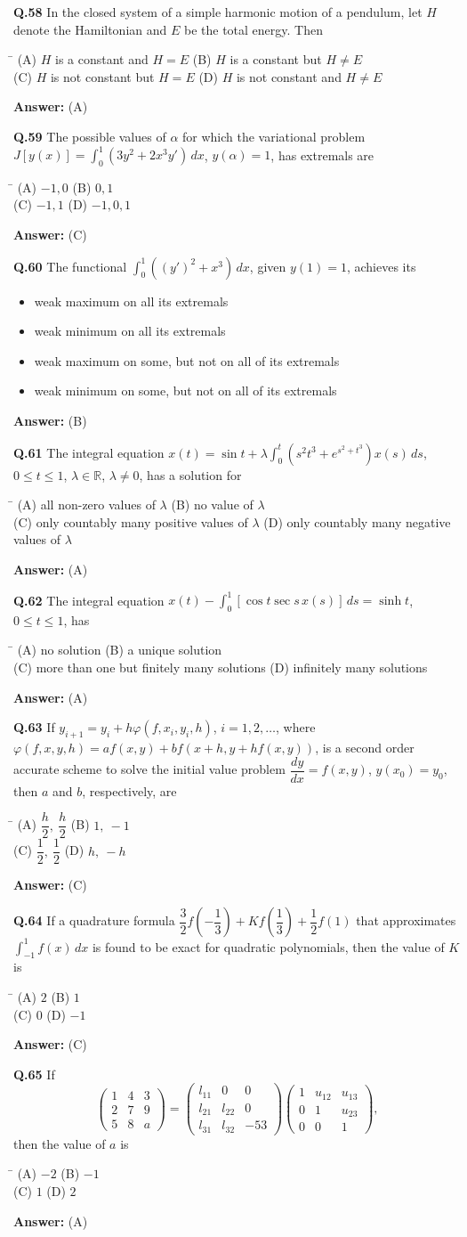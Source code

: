 \documentclass[11pt,a4paper]{article}
\newcommand{\optsfourA}[4]{%
  \begin{tabbing}
    \hspace{0.48\linewidth}\=\kill
    (A) #1 \> (B) #2 \\[2pt]
    (C) #3 \> (D) #4
  \end{tabbing}%
}
\newcommand{\optslistA}[4]{%
  \begin{itemize}
    \setlength{\itemsep}{2pt}\setlength{\parskip}{0pt}
    \item[(A)] #1
    \item[(B)] #2
    \item[(C)] #3
    \item[(D)] #4
  \end{itemize}%
}
\newcommand{\ans}[1]{\textbf{Answer:} #1\par\medskip}
\begin{document}
\textbf{Q.58} In the closed system of a simple harmonic motion of a pendulum, let $H$ denote the Hamiltonian and $E$ be the total energy. Then
\optsfourA{$H$ is a constant and $H = E$}{$H$ is a constant but $H \ne E$}{$H$ is not constant but $H = E$}{$H$ is not constant and $H \ne E$}
\ans{(A)}

\textbf{Q.59} The possible values of $\alpha$ for which the variational problem $J[y(x)] = \displaystyle\int_0^1 (3y^2 + 2x^3 y')\,dx$, $y(\alpha) = 1$, has extremals are
\optsfourA{$-1, 0$}{$0, 1$}{$-1, 1$}{$-1, 0, 1$}
\ans{(C)}

\textbf{Q.60} The functional $\displaystyle\int_0^1 ((y')^2 + x^3)\,dx$, given $y(1) = 1$, achieves its
\optslistA{weak maximum on all its extremals}{weak minimum on all its extremals}{weak maximum on some, but not on all of its extremals}{weak minimum on some, but not on all of its extremals}
\ans{(B)}

\textbf{Q.61} The integral equation $x(t) = \sin t + \lambda \displaystyle\int_0^t (s^2 t^3 + e^{s^2 + t^3})x(s)\,ds$, $0 \le t \le 1$, $\lambda \in \mathbb{R}$, $\lambda \ne 0$, has a solution for
\optsfourA{all non-zero values of $\lambda$}{no value of $\lambda$}{only countably many positive values of $\lambda$}{only countably many negative values of $\lambda$}
\ans{(A)}

\textbf{Q.62} The integral equation $x(t) - \displaystyle\int_0^1 [\cos t \sec s\, x(s)]\,ds = \sinh t$, $0 \le t \le 1$, has
\optsfourA{no solution}{a unique solution}{more than one but finitely many solutions}{infinitely many solutions}
\ans{(A)}

\textbf{Q.63} If $y_{i+1} = y_i + h\varphi(f, x_i, y_i, h)$, $i = 1, 2, \dots$, where $\varphi(f, x, y, h) = a f(x, y) + b f(x + h, y + h f(x, y))$, is a second order accurate scheme to solve the initial value problem $\dfrac{dy}{dx} = f(x, y)$, $y(x_0) = y_0$, then $a$ and $b$, respectively, are
\optsfourA{$\dfrac{h}{2},\ \dfrac{h}{2}$}{$1,\ -1$}{$\dfrac{1}{2},\ \dfrac{1}{2}$}{$h,\ -h$}
\ans{(C)}

\textbf{Q.64} If a quadrature formula $\dfrac{3}{2}f\!\left(-\dfrac{1}{3}\right) + K f\!\left(\dfrac{1}{3}\right) + \dfrac{1}{2}f(1)$ that approximates $\displaystyle\int_{-1}^{1} f(x)\,dx$ is found to be exact for quadratic polynomials, then the value of $K$ is
\optsfourA{$2$}{$1$}{$0$}{$-1$}
\ans{(C)}

\textbf{Q.65} If
\[
  \begin{pmatrix} 1 & 4 & 3 \\ 2 & 7 & 9 \\ 5 & 8 & a \end{pmatrix}
  =
  \begin{pmatrix} l_{11} & 0 & 0 \\ l_{21} & l_{22} & 0 \\ l_{31} & l_{32} & -53 \end{pmatrix}
  \begin{pmatrix} 1 & u_{12} & u_{13} \\ 0 & 1 & u_{23} \\ 0 & 0 & 1 \end{pmatrix},
\]
then the value of $a$ is
\optsfourA{$-2$}{$-1$}{$1$}{$2$}
\ans{(A)}
\end{document}
